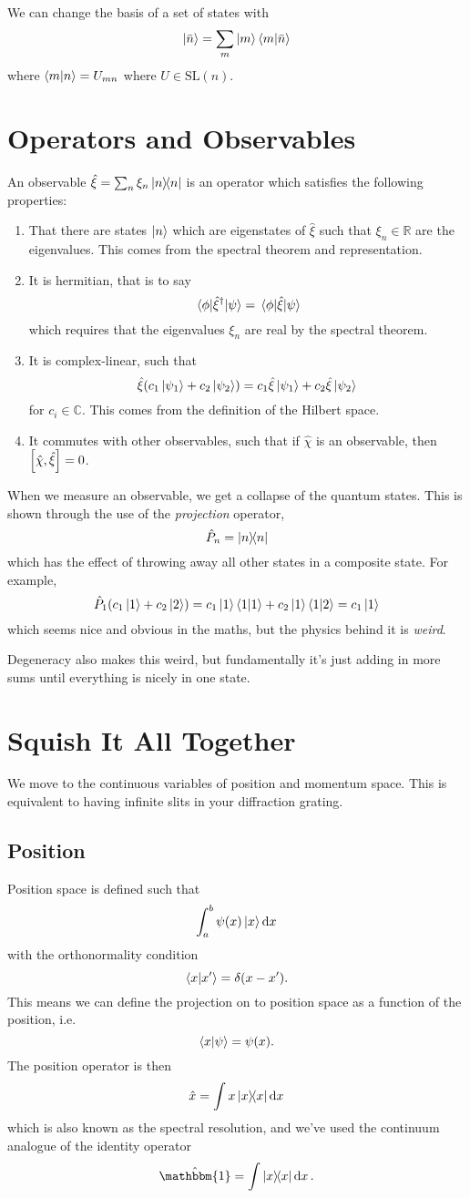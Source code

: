 \documentclass[]{scrreprt}
\begin{document}
We can change the basis of a set of states with \[\ket{\bar{n}} = \sum_{m} \ket{m}\braket{m}{\bar{n}} \] where \(\braket{m}{n} = U_{mn}\) where $U \in \mathrm{SL}(n)$.

\section{Operators and Observables}
An observable \(\hat\xi = \sum_n \xi_n \op{n}\) is an operator which satisfies the following properties:
\begin{enumerate}
  \item That there are states \(\ket{n}\) which are eigenstates of $\hat \xi$ such that $\xi_n \in \mathbb{R}$ are the eigenvalues.
  This comes from the spectral theorem and representation.
  \item It is hermitian, that is to say \[\mel{\phi}{\hat\xi^\dagger}{\psi} =\mel{\phi}{\hat\xi}{\psi}\] which requires that the eigenvalues $\xi_n$ are real by the spectral theorem.
  \item It is complex-linear, such that \[ \hat\xi(c_1 \ket{\psi_1} + c_2 \ket{\psi_2} ) = c_1\hat\xi \ket{\psi_1} + c_2\hat\xi \ket{\psi_2} \] for $c_i \in \mathbb{C}$. This comes from the definition of the Hilbert space.
  \item It commutes with other observables, such that if $\hat{\chi}$ is an observable, then $\commutator{\hat\chi}{\hat\xi}=0$.
\end{enumerate}

When we measure an observable, we get a collapse of the quantum states.
This is shown through the use of the \emph{projection} operator, \[\hat{P}_n = \ketbra{n}\] which has the effect of throwing away all other states in a composite state.
For example, \[ \hat{P}_1 (c_1\ket{1} + c_2\ket{2}) = c_1\ket{1}\braket{1} + c_2\ket{1}\bra{1}\ket{2} = c_1 \ket{1} \] which seems nice and obvious in the maths, but the physics behind it is \emph{weird}.

Degeneracy also makes this weird, but fundamentally it's just adding in more sums until everything is nicely in one state.

\section{Squish It All Together}
We move to the continuous variables of position and momentum space.
This is equivalent to having infinite slits in your diffraction grating.

\subsection{Position}
Position space is defined such that \[ \int_a^b \psi(x) \ket{x} \dd{x}\] with the orthonormality condition \[\braket{x}{x^\prime}=\delta(x-x^\prime). \]
This means we can define the projection on to position space as a function of the position, i.e.~\[\braket{x}{\psi} = \psi(x).\]
The position operator is then \[ \hat{x} = \int x \ketbra{x} \dd{x} \] which is also known as the spectral resolution, and we've used the continuum analogue of the identity operator
\[ \hat{\mathbbm{1}} = \int \ketbra{x}\dd{x}. \]
\end{document}
